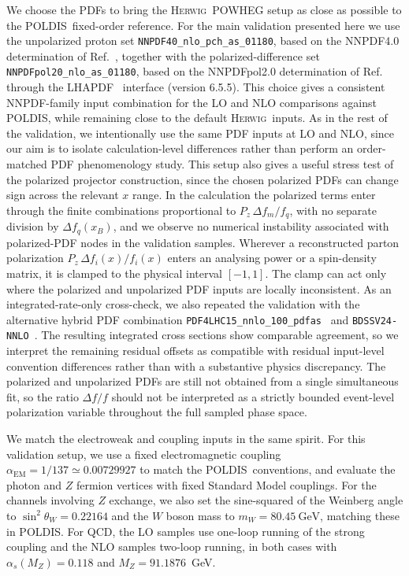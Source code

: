 \documentclass[a4paper,11pt]{article}
\newcommand{\Herwig}{\textsc{Herwig}}
\newcommand{\POLDIS}{\textsc{POLDIS}}
\begin{document}
We choose the PDFs to bring the \Herwig\ \textsc{POWHEG} setup as
close as possible to the \POLDIS\ fixed-order reference. For the main
validation presented here we use the unpolarized proton set
\texttt{NNPDF40\_nlo\_pch\_as\_01180}, based on the NNPDF4.0 determination
of Ref.~\cite{NNPDF:2021njg}, together with the polarized-difference set
\texttt{NNPDFpol20\_nlo\_as\_01180}, based on the NNPDFpol2.0 determination
of Ref.~\cite{Cruz-Martinez:2025ahf} through the \textsc{LHAPDF}~\cite{Buckley:2014ana} interface (version 6.5.5). This choice gives a consistent
NNPDF-family input combination for the LO and NLO comparisons against
\POLDIS, while remaining close to the default \Herwig\ inputs. As in the rest of the validation, we intentionally
use the same PDF inputs at LO and NLO, since our aim is to isolate
calculation-level differences rather than perform an order-matched PDF
phenomenology study.
This setup also gives a useful stress test of the polarized projector
construction, since the chosen polarized PDFs can change sign across the
relevant $x$ range. In the calculation the polarized terms enter through the
finite combinations proportional to $P_z\,\Delta f_m/f_q$, with no separate
division by $\Delta f_q(x_B)$, and we observe no numerical instability
associated with polarized-PDF nodes in the validation samples.
Wherever a reconstructed parton polarization $P_z\,\Delta f_i(x)/f_i(x)$
enters an analysing power or a spin-density matrix, it is clamped to the
physical interval $[-1,1]$. The clamp can act only where the polarized and
unpolarized PDF inputs are locally inconsistent.
As an integrated-rate-only cross-check, we also repeated the validation with the
alternative hybrid PDF combination
\texttt{PDF4LHC15\_nnlo\_100\_pdfas}~\cite{Butterworth:2015oua} and
\texttt{BDSSV24-NNLO}~\cite{Borsa:2024mss}. The resulting integrated cross
sections show comparable agreement, so we interpret the remaining residual
offsets as compatible with residual input-level convention differences rather
than with a substantive physics discrepancy. The polarized and unpolarized PDFs
are still not obtained from a single simultaneous fit, so the ratio
$\Delta f/f$ should not be interpreted as a strictly bounded event-level
polarization variable throughout the full sampled phase space.

We match the electroweak and coupling inputs in the same spirit. For this
validation setup, we use a fixed electromagnetic coupling
$\alpha_{\mathrm{EM}}=1/137 \simeq 0.00729927$ to match the \POLDIS\
conventions, and evaluate the photon and $Z$ fermion vertices with fixed
Standard Model couplings. For the channels involving $Z$ exchange, we also set
the sine-squared of the Weinberg angle to $\sin^2\theta_W=0.22164$ and the $W$
boson mass to $m_W=80.45~\mathrm{GeV}$, matching these in \POLDIS. For QCD, the LO samples use one-loop running of the strong coupling and
the NLO samples two-loop running, in both cases with $\alpha_s(M_Z)=0.118$
and $M_Z = 91.1876$~GeV.
\end{document}
